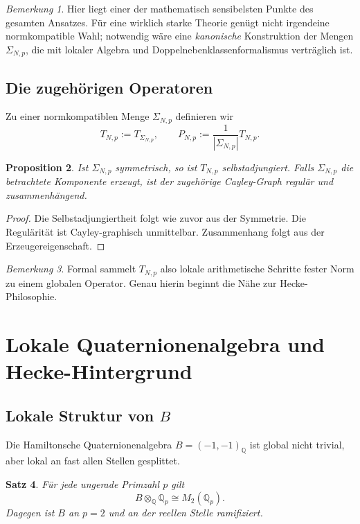 \documentclass[12pt,a4paper]{article}
\theoremstyle{plain}
\newtheorem{satz}{Satz}[section]
\newtheorem{proposition}[satz]{Proposition}
\theoremstyle{definition}
\theoremstyle{remark}
\newtheorem{bemerkung}[satz]{Bemerkung}
\newcommand{\Q}{\mathbb{Q}}
\begin{document}
	\begin{bemerkung}
		Hier liegt einer der mathematisch sensibelsten Punkte des gesamten Ansatzes.
		Für eine wirklich starke Theorie genügt nicht irgendeine normkompatible Wahl;
		notwendig wäre eine \emph{kanonische} Konstruktion der Mengen \(\Sigma_{N,p}\),
		die mit lokaler Algebra und Doppelnebenklassenformalismus verträglich ist.
	\end{bemerkung}
	
	\subsection{Die zugehörigen Operatoren}
	
	Zu einer normkompatiblen Menge \(\Sigma_{N,p}\) definieren wir
	\[
	T_{N,p}:=T_{\Sigma_{N,p}},\qquad
	P_{N,p}:=\frac{1}{|\Sigma_{N,p}|}T_{N,p}.
	\]
	
	\begin{proposition}
		Ist \(\Sigma_{N,p}\) symmetrisch, so ist \(T_{N,p}\) selbstadjungiert.
		Falls \(\Sigma_{N,p}\) die betrachtete Komponente erzeugt,
		ist der zugehörige Cayley-Graph regulär und zusammenhängend.
	\end{proposition}
	
	\begin{proof}
		Die Selbstadjungiertheit folgt wie zuvor aus der Symmetrie.
		Die Regulärität ist Cayley-graphisch unmittelbar.
		Zusammenhang folgt aus der Erzeugereigenschaft.
	\end{proof}
	
	\begin{bemerkung}
		Formal sammelt \(T_{N,p}\) also lokale arithmetische Schritte fester Norm
		zu einem globalen Operator. Genau hierin beginnt die Nähe zur Hecke-Philosophie.
	\end{bemerkung}
	
	\section{Lokale Quaternionenalgebra und Hecke-Hintergrund}
	
	\subsection{Lokale Struktur von \texorpdfstring{$B$}{B}}
	
	Die Hamiltonsche Quaternionenalgebra \(B=(-1,-1)_\Q\) ist global nicht trivial,
	aber lokal an fast allen Stellen gesplittet.
	
	\begin{satz}
		Für jede ungerade Primzahl \(p\) gilt
		\[
		B\otimes_\Q \Q_p \cong M_2(\Q_p).
		\]
		Dagegen ist \(B\) an \(p=2\) und an der reellen Stelle ramifiziert.
	\end{satz}
	
\end{document}
